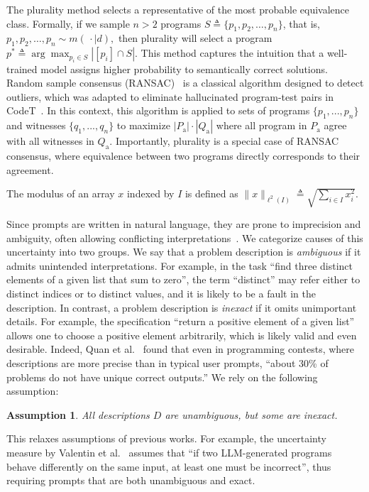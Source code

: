 \documentclass[acmsmall,screen,nonacm]{acmart}
\newtheorem{assumption}{Assumption}
\begin{document}
The plurality method selects a representative of the most probable equivalence class. Formally, if we sample $n>2$ programs $S\triangleq \{p_1, p_2, \dots, p_n\}$, that is, $p_1, p_2, \dots, p_n \sim m(\,\cdot \mid d),$ then plurality will select a program $p^\ast \triangleq \arg\max_{p_i \in S} | [p_i] \cap S|$.  This method captures the intuition that a well-trained model assigns higher probability to semantically correct solutions. Random sample consensus (RANSAC)~\cite{fischler1981random} is a classical algorithm designed to detect outliers, which was adapted to eliminate hallucinated program-test pairs in CodeT~\cite{chen2022codet}. In this context, this algorithm is applied to sets of programs $\{p_1, ..., p_n\}$ and witnesses $\{q_1, ..., q_n\}$ to maximize $|P_\mathrm{a}| \cdot |Q_\mathrm{a}|$ where all program in $P_\mathrm{a}$ agree with all witnesses in $Q_\mathrm{a}$. Importantly, plurality is a special case of RANSAC consensus, where equivalence between two programs directly corresponds to their agreement.

The modulus of an array $x$ indexed by $I$ is defined as $\|x\|_{\ell^2(I)}\triangleq\sqrt{\sum_{i\in I}x_i^2}.$

Since prompts are written in natural language, they are prone to imprecision and ambiguity, often allowing conflicting interpretations~\cite{jia2025automated}. We categorize causes of this uncertainty into two groups. We say that a problem description is \emph{ambiguous} if it admits unintended interpretations. For example, in the task ``find three distinct elements of a given list that sum to zero'', the term ``distinct'' may refer either to distinct indices or to distinct values, and it is likely to be a fault in the description. In contrast, a problem description is \emph{inexact} if it omits unimportant details. For example, the specification ``return a positive element of a given list'' allows one to choose a positive element arbitrarily, which is likely valid and even desirable. Indeed, Quan et al.~\cite{quan2025codeelobenchmarkingcompetitionlevelcode} found that even in programming contests, where descriptions are more precise than in typical user prompts, ``about 30\% of problems do not have unique correct outputs.'' We rely on the following assumption:

\begin{assumption}\label{assumption:inexact}
  All descriptions $D$ are unambiguous, but some are inexact.
\end{assumption}

\noindent This relaxes assumptions of previous works. For example, the uncertainty measure by Valentin et al.~\cite{valentin2025estimating} assumes that ``if two LLM-generated programs behave differently on the same input, at least one must be incorrect'', thus requiring prompts that are both unambiguous and exact.
\end{document}
